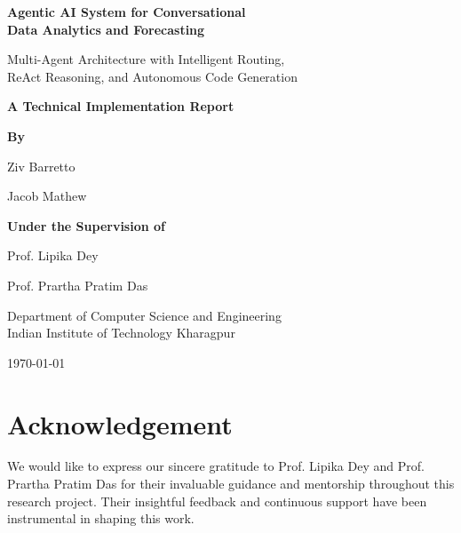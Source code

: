 \documentclass[11pt,a4paper]{article}
\begin{document}
\begin{titlepage}
    \centering
    \vspace*{1.5cm}

    {\LARGE\bfseries Agentic AI System for Conversational\\Data Analytics and Forecasting\par}
    \vspace{0.5cm}
    {\large Multi-Agent Architecture with Intelligent Routing,\\ReAct Reasoning, and Autonomous Code Generation\par}
    \vspace{1cm}

    {\Large\textbf{A Technical Implementation Report}\par}
    \vspace{1.5cm}

    {\large\textbf{By}\par}
    \vspace{0.3cm}
    {\Large Ziv Barretto\par}
    {\Large Jacob Mathew\par}
    \vspace{1.5cm}

    {\large\textbf{Under the Supervision of}\par}
    \vspace{0.3cm}
    {\Large Prof. Lipika Dey\par}
    {\Large Prof. Prartha Pratim Das\par}
    \vspace{1.5cm}

    {\large Department of Computer Science and Engineering\\
    Indian Institute of Technology Kharagpur\par}
    \vspace{0.8cm}

    {\large\today\par}
\end{titlepage}

\newpage
\section*{Acknowledgement}

\vspace{1.5cm}
We would like to express our sincere gratitude to Prof. Lipika Dey and Prof. Prartha Pratim Das for their invaluable guidance and mentorship throughout this research project. Their insightful feedback and continuous support have been instrumental in shaping this work.
\end{document}
